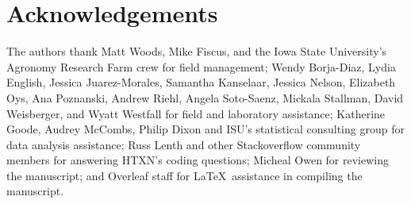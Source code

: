 \documentclass[
]{article}
\begin{document}
\hypertarget{acknowledgements}{%
\section*{Acknowledgements}\label{acknowledgements}}

The authors thank Matt Woods, Mike Fiscus, and the Iowa State University's Agronomy Research Farm crew for field management; Wendy Borja-Diaz, Lydia English, Jessica Juarez-Morales, Samantha Kanselaar, Jessica Nelson, Elizabeth Oys, Ana Poznanski, Andrew Riehl, Angela Soto-Saenz, Mickala Stallman, David Weisberger, and Wyatt Westfall for field and laboratory assistance; Katherine Goode, Audrey McCombs, Philip Dixon and ISU's statistical consulting group for data analysis assistance; Russ Lenth and other Stackoverflow community members for answering HTXN's coding questions; Micheal Owen for reviewing the manuscript; and Overleaf staff for \LaTeX~assistance in compiling the manuscript.

\renewcommand\refname{References}
  
\end{document}
